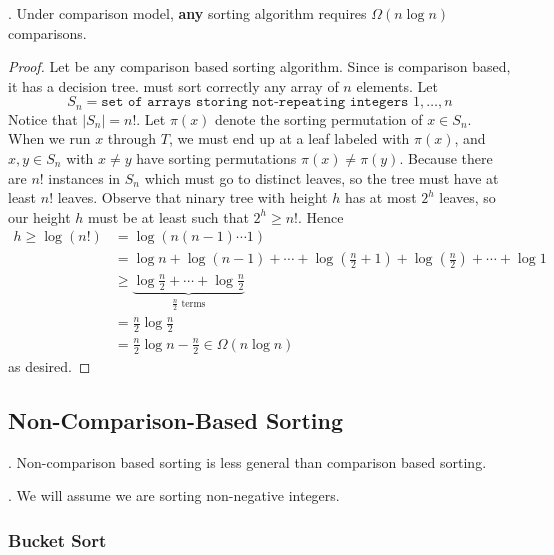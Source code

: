\documentclass{article}
\begin{document}
\begin{thmm}[].
    Under comparison model, \textbf{any} sorting algorithm requires $\Omega (n \log{n})$ comparisons. 
\end{thmm}

\begin{proof}
    Let  be any comparison based sorting algorithm. Since  is comparison based, it has a decision tree.  must sort correctly any array of $n$ elements. Let 
    \[ S_n = \texttt{set of arrays storing not-repeating integers $1, \ldots, n$} \] 
    Notice that $|S_n| = n!$. Let $\pi(x)$ denote the sorting permutation of $x \in S_n$. When we run $x$ through $T$, we must end up at a leaf labeled with $\pi(x)$, and $x, y \in S_n$ with $x \neq y$ have sorting permutations $\pi(x) \neq \pi(y)$. Because there are $n!$ instances in  $S_n$ which must go to distinct leaves, so the tree must have at least $n!$ leaves. Observe that ninary tree with height $h$ has at most $2^h$ leaves, so our height $h$ must be at least such that $2^h \geq n!$. Hence \begin{align*}
        h \geq \log(n!)
        & = \log(n(n - 1) \cdots 1) \\ 
        & = \log n + \log(n-1) + \cdots + \log\left(\frac{n}{2} + 1\right) + \log\left(\frac{n}{2}\right) + \cdots + \log 1 \\ 
        & \geq \underbrace{\log \frac{n}{2} + \cdots + \log \frac{n}{2}}_{\frac{n}{2} \text{ terms}} \\ 
        & = \frac{n}{2} \log \frac{n}{2} \\ 
        & = \frac{n}{2} \log n - \frac{n}{2} \in \Omega(n \log n)
    \end{align*}
    as desired. 
\end{proof}

\subsection{Non-Comparison-Based Sorting}

\begin{algo}[].
    Non-comparison based sorting is less general than comparison based sorting. 
\end{algo}

\begin{comm}[].
    We will assume we are sorting non-negative integers. 
\end{comm}

\subsubsection{Bucket Sort} 
\end{document}
